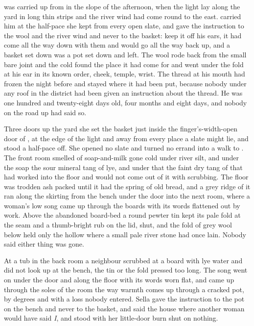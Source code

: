  was carried up from  in the slope of the afternoon, when the light lay along the yard in long thin strips and the river wind had come round to the east.  carried him at the half-pace she kept from every open slate, and gave the instruction to the wool and the river wind and never to the basket: keep it off his ears, it had come all the way down with them and would go all the way back up, and a basket set down was a pot set down and left. The wool rode back from the small bare joint and the cold found the place it had come for and went under the fold at his ear in its known order, cheek, temple, wrist. The thread at his mouth had frozen the night before and stayed where it had been put, because nobody under any roof in the district had been given an instruction about the thread. He was one hundred and twenty-eight days old, four months and eight days, and nobody on the road up had said so.

Three doors up the yard she set the basket just inside the finger's-width-open door of , at the edge of the light and away from every place a slate might lie, and stood a half-pace off. She opened no slate and turned no errand into a walk to . The front room smelled of soap-and-milk gone cold under river silt, and under the soap the sour mineral tang of lye, and under that the faint dry tang of  that had worked into the floor and would not come out of it with scrubbing. The floor was trodden ash packed until it had the spring of old bread, and a grey ridge of it ran along the skirting from the bench under the door into the next room, where a woman's low song came up through the boards with its words flattened out by work. Above the abandoned board-bed a round pewter tin kept its pale fold at the seam and a thumb-bright rub on the lid, shut, and the fold of grey wool below held only the hollow where a small pale river stone had once lain. Nobody said either thing was gone.

At a tub in the back room a neighbour scrubbed at a board with lye water and did not look up at the bench, the tin or the fold pressed too long. The song went on under the door and along the floor with its words worn flat, and came up through the soles of the room the way warmth comes up through a cracked pot, by degrees and with a loss nobody entered. Sella gave the instruction to the pot on the bench and never to the basket, and said the house where another woman would have said \emph{I}, and stood with her little-door burn shut on nothing.


